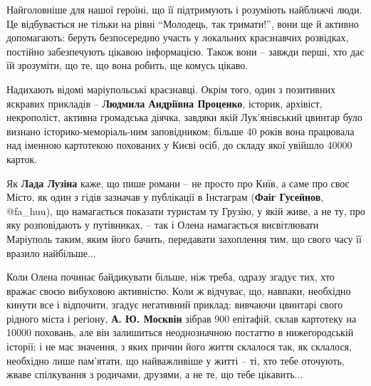 Найголовніше для нашої героїні, що її підтримують і розуміють найближчі люди.
Це відбувається не тільки на рівні \enquote{Молодець, так тримати!}, вони ще й активно
допомагають: беруть безпосередню участь у локальних краєзнавчих розвідках,
постійно забезпечують цікавою інформацією. Також вони – завжди перші, хто дає
їй зрозуміти, що те, що вона робить, ще комусь цікаво.


Надихають відомі маріупольські краєзнавці. Окрім того, один з позитивних
яскравих прикладів – \textbf{Людмила Андріївна Проценко}, історик, архівіст,
некрополіст, активна громадська діячка, завдяки якій Лук'янівський цвинтар було
визнано історико-меморіаль\hyp{}ним заповідником; більше 40 років вона працювала над
іменною картотекою похованих у Києві осіб, до складу якої увійшло 40000 карток.

Як \textbf{Лада Лузіна} каже, що пише романи – не просто про Київ, а саме про своє
Місто, як один з гідів зазначав у публікації в Інстаграм (\textbf{Фаіг Гусейнов},
@fa\_huu), що намагається показати туристам ту Грузію, у якій живе, а не ту, про
яку розповідають у путівниках, – так і Олена намагається висвітлювати Маріуполь
таким, яким його бачить, передавати захоплення тим, що свого часу її вразило
найбільше...

Коли Олена починає байдикувати більше, ніж треба, одразу згадує тих, хто вражає
своєю вибуховою активністю. Коли ж відчуває, що, навпаки, необхідно кинути все
і відпочити, згадує негативний приклад: вивчаючи цвинтарі свого рідного міста і
регіону, \textbf{А. Ю. Москвін} зібрав 900 епітафій, склав картотеку на 10000 поховань,
але він залишиться неоднозначною постаттю в нижегородській історії; і не має
значення, з яких причин його життя склалося так, як склалося, необхідно лише
пам'ятати, що найважливіше у житті – ті, хто тебе оточують, жваве спілкування з
родичами, друзями, а не те, що тебе цікавить...

